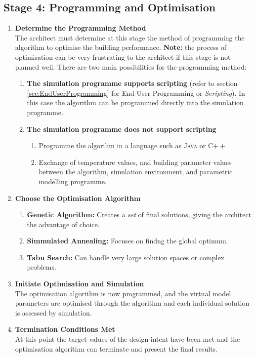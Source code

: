 \clearpage
\colorbox{95Gray}{%
	\begin{minipage}[c][20.5cm][t]{\textwidth}{%
		\subsection{Stage 4: Programming and Optimisation}
		\label{sec:Stage4}
		\vspace{0.5cm}
		\begin{enumerate}
			\item \textbf{Determine the Programming Method}\\[3mm]
				The architect must determine at this stage the method of programming the algorithm to optimise the building performance. \textbf{Note:} the process of optimisation can be very frustrating to the architect if this stage is not planned well. There are two main possibilities for the programming method:
				\begin{enumerate}
					\item \textbf{The simulation programme supports scripting} (refer to section \ref{sec:EndUserProgramming} for End-User Programming or \emph{Scripting}). In this case the algorithm can be programmed directly into the simulation programme.
					\item \textbf{The simulation programme does not support scripting}
						\begin{enumerate}
							\item Programme the algorihm in a language such as \textsc{Java} or C$++$ 
							\item Exchange of temperature values, and building parameter values between the algorithm, simulation environment, and parametric modelling programme.
						\end{enumerate}
				\end{enumerate}
			\item \textbf{Choose the Optimisation Algorithm}
				\begin{enumerate}
					\item \textbf{Genetic Algorithm:} Creates a \emph{set} of final solutions, giving the architect the advantage of choice.
					\item \textbf{Simmulated Annealing:} Focuses on findng the global optimum.
					\item \textbf{Tabu Search:} Can handle very large solution spaces or complex problems.
				\end{enumerate}
			\item \textbf{Initiate Optimisation and Simulation}\\[3mm]
				The optimisation algorithm is now programmed, and the virtual model parameters are optimised through the algorithm and each individual solution is assessed by simulation.
			\item \textbf{Termination Conditions Met}\\[3mm]
				At this point the target values of the design intent have been met and the optimisation algorithm can terminate and present the final results.
		\end{enumerate}
	}%
\end{minipage}%
}

